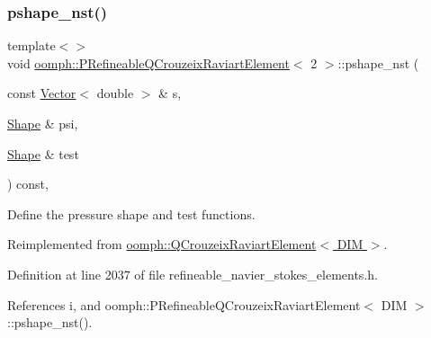 \subsubsection{\texorpdfstring{pshape\+\_\+nst()}{pshape\_nst()}\hspace{0.1cm}{\footnotesize\ttfamily [4/6]}}
{\footnotesize\ttfamily template$<$$>$ \\
void \hyperlink{classoomph_1_1PRefineableQCrouzeixRaviartElement}{oomph\+::\+P\+Refineable\+Q\+Crouzeix\+Raviart\+Element}$<$ 2 $>$\+::pshape\+\_\+nst (\begin{DoxyParamCaption}\item[{const \hyperlink{classoomph_1_1Vector}{Vector}$<$ double $>$ \&}]{s,  }\item[{\hyperlink{classoomph_1_1Shape}{Shape} \&}]{psi,  }\item[{\hyperlink{classoomph_1_1Shape}{Shape} \&}]{test }\end{DoxyParamCaption}) const\hspace{0.3cm}{\ttfamily [inline]}, {\ttfamily [virtual]}}



Define the pressure shape and test functions. 



Reimplemented from \hyperlink{classoomph_1_1QCrouzeixRaviartElement_a662b9593c9ca0b4589d5498812f1fb91}{oomph\+::\+Q\+Crouzeix\+Raviart\+Element$<$ D\+I\+M $>$}.



Definition at line 2037 of file refineable\+\_\+navier\+\_\+stokes\+\_\+elements.\+h.



References i, and oomph\+::\+P\+Refineable\+Q\+Crouzeix\+Raviart\+Element$<$ D\+I\+M $>$\+::pshape\+\_\+nst().

\mbox{\label{classoomph_1_1PRefineableQCrouzeixRaviartElement_a556b7533944abd5eedce664d708b4eae}} 
